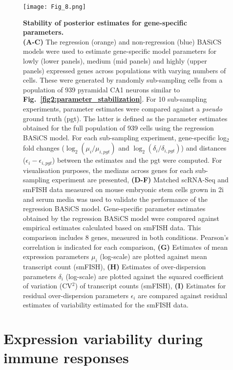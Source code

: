 \begin{figure}[!h]
\centering
\texttt{[image: Fig\_8.png]}
\caption[Stability of posterior estimates for gene-specific parameters]{\textbf{Stability of posterior estimates for gene-specific parameters.}\\
\textbf{(A-C)} The regression (orange) and non-regression (blue) BASiCS models were used to estimate gene-specific model parameters for lowly (lower panels), medium (mid panels) and highly (upper panels) expressed genes across populations with varying numbers of cells. These were generated by randomly sub-sampling cells from a population of 939 pyramidal CA1 neurons \citep{Zeisel2015} similar to \textbf{Fig.~\ref{fig2:parameter_stabilization}}. For 10 sub-sampling experiments, parameter estimates were compared against a \textit{pseudo} ground truth (pgt). The latter is defined as the parameter estimates obtained for the full population of 939 cells using the regression BASiCS model. For each sub-sampling experiment, gene-specific log$_2$ fold changes ($\log_2(\mu_i/\mu_{i,pgt})$ and $\log_2(\delta_i/\delta_{i,pgt})$) and distances ($\epsilon_i - \epsilon_{i,pgt}$) between the estimates and the pgt were computed. For visualisation purposes, the medians across genes for each sub-sampling experiment are presented, \textbf{(D-F)} Matched scRNA-Seq and smFISH data measured on mouse embryonic stem cells grown in 2i and serum media \citep{Grun2014} was used to validate the performance of the regression BASiCS model. Gene-specific parameter estimates obtained by the regression BASiCS model were compared against empirical estimates calculated based on smFISH data. This comparison includes 8 genes, measured in both conditions. Pearson's correlation is indicated for each comparison, \textbf{(G)} Estimates of mean expression parameters $\mu_i$ (log-scale) are plotted against mean transcript count (smFISH), \textbf{(H)} Estimates of over-dispersion parameters $\delta_i$ (log-scale) are plotted against the squared coefficient of variation (CV$^2$) of transcript counts (smFISH), \textbf{(I)} Estimates for residual over-dispersion parameters $\epsilon_i$ are compared against residual estimates of variability estimated for the smFISH data.}
\label{fig2:parameter_stabilization2}
\end{figure}

\newpage

\section{Expression variability during immune responses}

